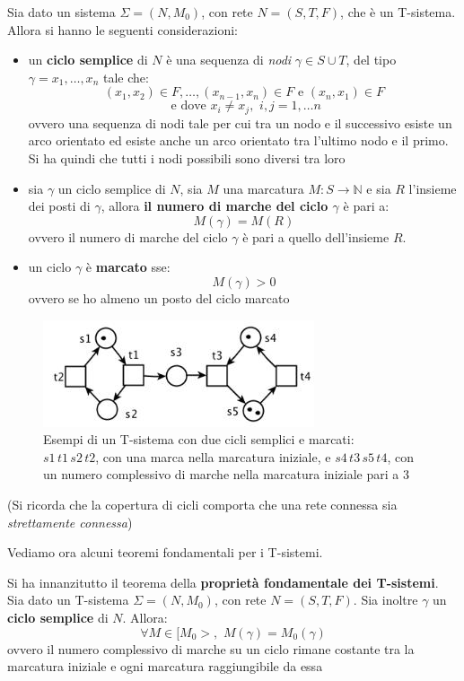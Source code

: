 \documentclass[a4paper,12pt, oneside]{book}
\begin{document}
\begin{definizione}
  Sia dato un sistema $\Sigma = (N,M_0)$, con rete $N=(S,T,F)$, che è un
  T-sistema. Allora si hanno le seguenti considerazioni:
  \begin{itemize}
    \item un \textbf{ciclo semplice} di $N$ è una sequenza di \textit{nodi}
    $\gamma \in S\cup T$, del tipo $\gamma=x_1,\ldots,x_n$ tale che:
    \[(x_1,x_2)\in F,\ldots,(x_{n-1},x_{n})\in F\mbox{ e } (x_n,x_1)\in F\]
    \[\mbox{ e dove } x_i\neq x_j,\,\,i,j=1,\ldots n\]
    ovvero una sequenza di nodi tale per cui tra un nodo e il successivo esiste
    un arco orientato ed esiste anche un arco orientato tra l'ultimo nodo e il
    primo. Si ha quindi che tutti i nodi possibili sono diversi tra loro
    \item sia $\gamma$ un ciclo semplice di $N$, sia $M$ una marcatura $M:S\to
    \mathbb{N}$ e sia $R$ l'insieme dei posti di $\gamma$, allora \textbf{il
      numero di marche del ciclo $\gamma$} è pari a:
    \[M(\gamma)=M(R)\]
    ovvero il numero di marche del ciclo $\gamma$ è pari a quello dell'insieme
    $R$.
    \item un ciclo $\gamma$ è \textbf{marcato} sse:
    \[M(\gamma)>0\]
    ovvero se ho almeno un posto del ciclo marcato
  \end{itemize}
  \begin{figure}[H]
    \centering
    \includegraphics[scale = 0.6]{img/tsi2.jpg}
    \caption{Esempi di un T-sistema con due cicli semplici e marcati:\\
      $s1\,t1\,s2\,t2$, con una marca nella marcatura iniziale, e
      $s4\,t3\,s5\,t4$, con un numero complessivo di marche nella marcatura
      iniziale pari a 3} 
  \end{figure}
  (Si ricorda che la copertura di cicli comporta che una rete connessa sia
  \emph{strettamente connessa})
\end{definizione}
Vediamo ora alcuni teoremi fondamentali per i T-sistemi.
\begin{teorema}
  Si ha innanzitutto il teorema della \textbf{proprietà fondamentale dei
    T-sistemi}.\\
  Sia dato un T-sistema $\Sigma = (N,M_0)$, con rete $N=(S,T,F)$. Sia inoltre
  $\gamma$ un \textbf{ciclo semplice} di $N$. Allora:
  \[\forall M\in [M_0>,\,\,M(\gamma) = M_0(\gamma)\]
  ovvero il numero complessivo di marche su un ciclo rimane costante tra la
  marcatura iniziale e ogni marcatura raggiungibile da essa
\end{teorema}
\end{document}
